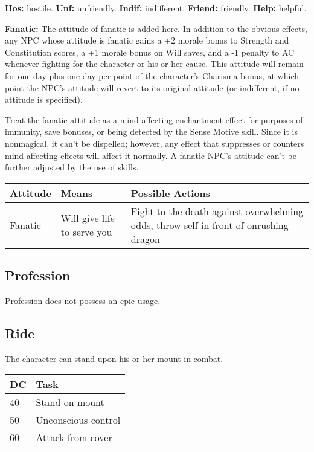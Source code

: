\documentclass{article}
\begin{document}
\textbf{Hos: }hostile. \textbf{Unf: }unfriendly. \textbf{Indif: }indifferent. \textbf{Friend: 
}friendly. \textbf{Help: }helpful.

\textbf{Fanatic: }The attitude of fanatic is added here. In addition to the obvious 
effects, any NPC whose attitude is fanatic gains a +2 morale bonus to Strength 
and Constitution scores, a +1 morale bonus on Will saves, and a -1 penalty to AC 
whenever fighting for the character or his or her cause. This attitude will remain 
for one day plus one day per point of the character's Charisma bonus, at which 
point the NPC's attitude will revert to its original attitude (or indifferent, 
if no attitude is specified). 

Treat the fanatic attitude as a mind-affecting enchantment effect for purposes 
of immunity, save bonuses, or being detected by the Sense Motive skill. Since it 
is nonmagical, it can't be dispelled; however, any effect that suppresses or counters 
mind-affecting effects will affect it normally. A fanatic NPC's attitude can't 
be further adjusted by the use of skills. 

\begin{tabular}{|>{\raggedright}p{30pt}|>{\raggedright}p{89pt}|>{\raggedright}p{194pt}|}
\hline
A\textbf{ttitude } & M\textbf{eans } & P\textbf{ossible Actions }\tabularnewline
\hline
Fanatic  & Will give life to serve you & Fight to the death against overwhelming 
odds, throw self in front of onrushing dragon \tabularnewline
\hline
\end{tabular}

\vspace{12pt}
\subsection*{Profession }

Profession does not possess an epic usage. 

\vspace{12pt}
\subsection*{Ride }

The character can stand upon his or her mount in combat. 

\begin{tabular}{|>{\raggedright}p{13pt}|>{\raggedright}p{81pt}|}
\hline
D\textbf{C} & T\textbf{ask }\tabularnewline
\hline
40  & Stand on mount \tabularnewline
\hline
50  & Unconscious control \tabularnewline
\hline
60  & Attack from cover \tabularnewline
\hline
\end{tabular}
\end{document}
